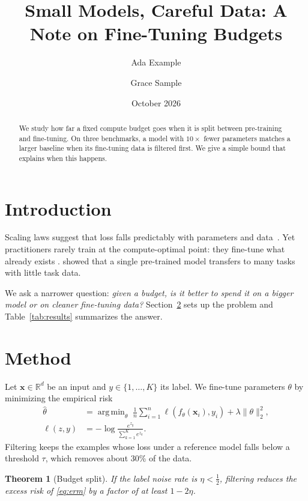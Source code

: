 \documentclass{article}
\title{Small Models, Careful Data: A Note on Fine-Tuning Budgets}
\author{Ada Example \and Grace Sample}
\date{October 2026}
\newcommand{\vect}[1]{\mathbf{#1}}
\newcommand{\R}{\mathbb{R}}
\DeclareMathOperator*{\argmin}{arg\,min}
\newtheorem{theorem}{Theorem}
\begin{document}
\maketitle

\begin{abstract}
We study how far a fixed compute budget goes when it is split between
pre-training and fine-tuning. On three benchmarks, a model with
$10\times$ fewer parameters matches a larger baseline when its fine-tuning
data is filtered first. We give a simple bound that explains when this
happens.
\end{abstract}

\section{Introduction}
\label{sec:intro}

Scaling laws suggest that loss falls predictably with parameters and
data~\citep{kaplan2020scaling}. Yet practitioners rarely train at the
compute-optimal point: they fine-tune what already exists
\citep[see][ch.~3]{howard2018universal}. \citet{devlin2019bert} showed that
a single pre-trained model transfers to many tasks with little task data.

We ask a narrower question: \emph{given a budget, is it better to spend it on
a bigger model or on cleaner fine-tuning data?} Section~\ref{sec:method}
sets up the problem and Table~\ref{tab:results} summarizes the answer.

\section{Method}
\label{sec:method}

Let $\vect{x} \in \R^d$ be an input and $y \in \{1, \dots, K\}$ its label.
We fine-tune parameters $\theta$ by minimizing the empirical risk
\begin{align}
  \hat{\theta} &= \argmin_{\theta} \; \frac{1}{n} \sum_{i=1}^{n}
    \ell\left(f_\theta(\vect{x}_i), y_i\right) + \lambda \|\theta\|_2^2,
    \label{eq:erm} \\
  \ell(z, y) &= -\log \frac{e^{z_y}}{\sum_{k=1}^{K} e^{z_k}}.
\end{align}
Filtering keeps the examples whose loss under a reference model falls
below a threshold $\tau$, which removes about 30\% of the data.

\begin{theorem}[Budget split]
If the label noise rate is $\eta < \frac{1}{2}$, filtering reduces the
excess risk of \eqref{eq:erm} by a factor of at least $1 - 2\eta$.
\end{theorem}
\end{document}
